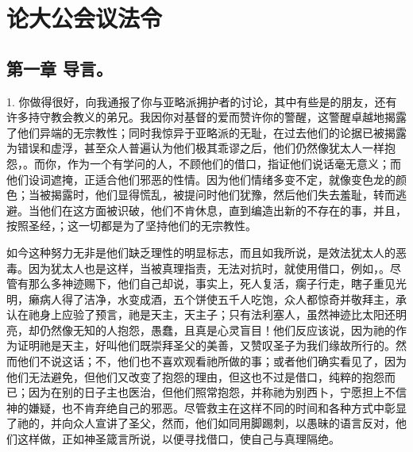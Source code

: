 
\chapter{论大公会议法令}



\section{第一章 导言。}

1. 你做得很好，向我通报了你与亚略派拥护者的讨论，其中有些是的朋友，还有许多持守教会教义的弟兄。我因你对基督的爱而赞许你的警醒，这警醒卓越地揭露了他们异端的无宗教性；同时我惊异于亚略派的无耻，在过去他们的论据已被揭露为错误和虚浮，甚至众人普遍认为他们极其乖谬之后，他们仍然像犹太人一样抱怨，。而你，作为一个有学问的人，不顾他们的借口，指证他们说话毫无意义；而他们设词遮掩，正适合他们邪恶的性情。因为他们情绪多变不定，就像变色龙的颜色；当被揭露时，他们显得慌乱，被提问时他们犹豫，然后他们失去羞耻，转而逃避。当他们在这方面被识破，他们不肯休息，直到编造出新的不存在的事，并且，按照圣经，；这一切都是为了坚持他们的无宗教性。\par

如今这种努力无非是他们缺乏理性的明显标志，而且如我所说，是效法犹太人的恶毒。因为犹太人也是这样，当被真理指责，无法对抗时，就使用借口，例如，。尽管有那么多神迹赐下，他们自己却说，事实上，死人复活，瘸子行走，瞎子重见光明，癞病人得了洁净，水变成酒，五个饼使五千人吃饱，众人都惊奇并敬拜主，承认在祂身上应验了预言，祂是天主，天主子；只有法利塞人，虽然神迹比太阳还明亮，却仍然像无知的人抱怨，愚蠢，且真是心灵盲目！他们反应该说，因为祂的作为证明祂是天主，好叫他们既崇拜圣父的美善，又赞叹圣子为我们缘故所行的。然而他们不说这话；不，他们也不喜欢观看祂所做的事；或者他们确实看见了，因为他们无法避免，但他们又改变了抱怨的理由，但这也不过是借口，纯粹的抱怨而已；因为在别的日子主也医治，但他们照常抱怨，并称祂为别西卜，宁愿担上不信神的嫌疑，也不肯弃绝自己的邪恶。尽管救主在这样不同的时间和各种方式中彰显了祂的，并向众人宣讲了圣父，然而，他们如同用脚踢刺，以愚昧的语言反对，他们这样做，正如神圣箴言所说，以便寻找借口，使自己与真理隔绝。\par

